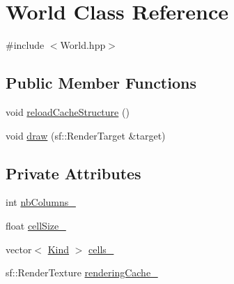 \hypertarget{class_world}{\section{World Class Reference}
\label{class_world}
}


{\ttfamily \#include $<$World.\-hpp$>$}

\subsection*{Public Member Functions}
\begin{DoxyCompactItemize}
\item 
void \hyperlink{class_world_a251c9bbb6687198ec55681fd4f1e1672}{reload\-Cache\-Structure} ()
\item 
void \hyperlink{class_world_a2e07a13d8859386bbc88df7261ce01fc}{draw} (sf\-::\-Render\-Target \&target)
\end{DoxyCompactItemize}
\subsection*{Private Attributes}
\begin{DoxyCompactItemize}
\item 
int \hyperlink{class_world_af977be110f600cba48f22b33e4e9ef72}{nb\-Columns\-\_\-}
\item 
float \hyperlink{class_world_aed8814e0c4693f42f57bfa267649ba78}{cell\-Size\-\_\-}
\item 
vector$<$ \hyperlink{_world_8hpp_a3a66ab4f6059050f3fce0595886ea4c5}{Kind} $>$ \hyperlink{class_world_a45190ce95669c7e323c44c2b19296c44}{cells\-\_\-}
\item 
sf\-::\-Render\-Texture \hyperlink{class_world_a83f5c8e6be1d367d31d454d67f37436c}{rendering\-Cache\-\_\-}
\end{DoxyCompactItemize}


